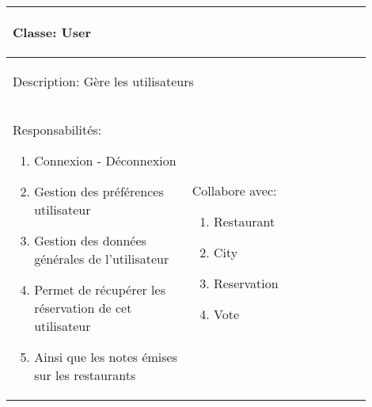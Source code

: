 \documentclass[10pt,a4paper]{article}
\author{Guillaume Derval}
\begin{document}
\begin{tabular}{|p{0.45\linewidth}|p{0.45\linewidth}|}
  \hline
  \multicolumn{2}{|l|}{\begin{large}
  	Classe: User
  \end{large}}\\
  \hline
  \multicolumn{2}{|l|}{\begin{normalsize}
  	Description: Gère les utilisateurs
  \end{normalsize}}\\[0.05\linewidth]
  \hline
  \begin{normalsize}
  	Responsabilités:
  	\begin{enumerate}
  		\item Connexion - Déconnexion
  		\item Gestion des préférences utilisateur
  		\item Gestion des données générales de l'utilisateur
  		\item Permet de récupérer les réservation de cet utilisateur
  		\item Ainsi que les notes émises sur les restaurants
  	\end{enumerate}
  \end{normalsize} & 
  \begin{normalsize}{
  	Collabore avec:
  	\begin{enumerate}
  		\item Restaurant
  		\item City
  		\item Reservation
  		\item Vote
  	\end{enumerate}
  }\end{normalsize}\\[0.6\linewidth]
  \hline
\end{tabular}
\end{document}
